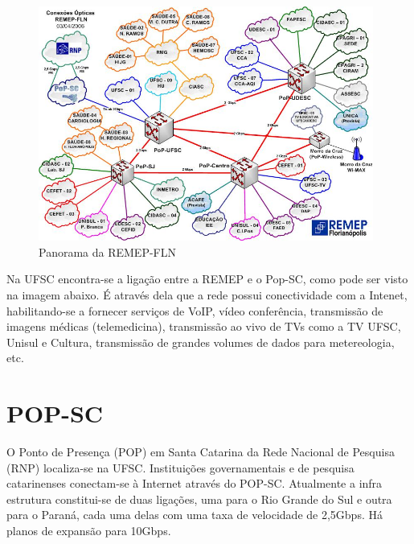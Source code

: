 \documentclass[brazil,times]{abnt}
\begin{document}
\begin{figure}[htp]
\begin{center}
  \includegraphics[width=110mm]{imagens/remep.jpeg}
  \caption[Panorama da REMEP-FLN]{Panorama da REMEP-FLN}
  \label{mapa-remep}
\end{center}
\end{figure}

Na UFSC encontra-se a ligação entre a REMEP e o Pop-SC, como pode ser visto na
imagem abaixo. É através dela que a rede possui conectividade com a Intenet,
habilitando-se a fornecer serviços de VoIP, vídeo conferência, transmissão de
imagens médicas (telemedicina), transmissão ao vivo de TVs como a TV UFSC,
Unisul e Cultura, transmissão de grandes volumes de dados para metereologia,
etc. \cite{apresentacao-rnp}


\section*{POP-SC}
O Ponto de Presença (POP) em Santa Catarina da Rede Nacional de Pesquisa (RNP)
localiza-se na UFSC. Instituições governamentais e de pesquisa catarinenses
conectam-se à Internet através do POP-SC. Atualmente a infra estrutura
constitui-se de duas ligações, uma para o Rio Grande do Sul e outra para o
Paraná, cada uma delas com uma taxa de velocidade de 2,5Gbps. Há planos de
expansão para 10Gbps.
\end{document}
